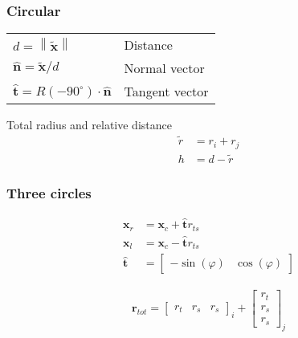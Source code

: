 \subsubsection{Circular}

\begin{table}[H]
\begin{tabularx}{1.0\linewidth}{ll}
\hline
\hline
$ d = \left\|\tilde{\mathbf{x}}\right\| $ & Distance\\
$ \hat{\mathbf{n}} = \tilde{\mathbf{x}} / d $ & Normal vector \\
$ \hat{\mathbf{t}} = R(-90^{\circ}) \cdot \hat{\mathbf{n}} $ & Tangent vector \\
\hline
\hline
\end{tabularx}
\end{table}

Total radius and relative distance
\begin{align}
\tilde{r} &= r_{i} + r_{j} \\
h &= d - \tilde{r}
\end{align}


\subsubsection{Three circles}

\begin{align}
\mathbf{x}_{r} &= \mathbf{x}_{c} + \hat{\mathbf{t}} r_{ts}  \\
\mathbf{x}_{l} &= \mathbf{x}_{c} - \hat{\mathbf{t}} r_{ts} \\
\hat{\mathbf{t}} &= \begin{bmatrix} -\sin(\varphi) & \cos(\varphi) \end{bmatrix}
\end{align}

\begin{align}
\mathbf{r}_{tot} = \begin{bmatrix} r_{t} & r_{s} & r_{s} \end{bmatrix}_{i} + \begin{bmatrix} r_{t} \\ r_{s} \\ r_{s} \end{bmatrix}_{j}
\end{align}

